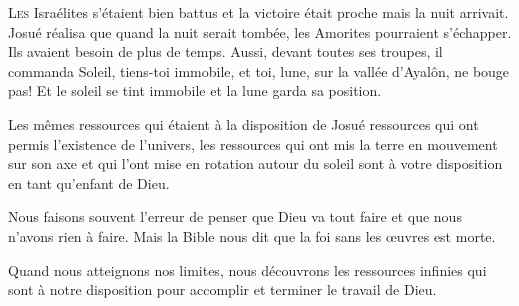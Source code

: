 



\lettrine{L}{es} Israélites s'étaient bien battus
 et la victoire était proche \ocadr mais la nuit arrivait.
 Josué réalisa que quand la nuit serait tombée,
 les Amorites pourraient s'échapper. Ils avaient besoin de plus de temps.
 Aussi, devant toutes ses troupes, il commanda\frcolon{}
 \Og Soleil, tiens-toi immobile, et toi, lune, sur la vallée d'Ayalôn,
 ne bouge pas! \Fg{}
 Et le soleil se tint immobile et la lune garda sa position.

Les mêmes ressources qui étaient à la disposition de Josué
 \ocadr ressources qui ont permis l'existence de l'univers,
 les ressources qui ont mis la terre en mouvement sur son axe
 et qui l'ont mise en rotation autour du soleil \fcadr{}
 sont à votre disposition en tant qu'enfant de Dieu.

Nous faisons souvent l'erreur de penser que Dieu va tout faire
 et que nous n'avons rien à faire.
 Mais la Bible nous dit que la foi sans les \oe{}uvres est morte.



Quand nous atteignons nos limites, nous découvrons les ressources infinies
 qui sont à notre disposition pour accomplir et terminer le travail de Dieu.

\dvrule



